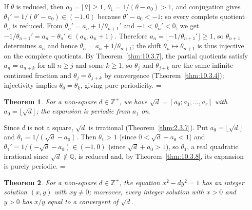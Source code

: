 \documentclass[11pt]{article}
\makeatletter
\theoremstyle{ntstyle}
\newtheorem{theorem}{Theorem}[subsection]
\let\nt@closedisplay\]
\def\nt@guardedclose{\@ifnextchar\par{\nt@closeafterpar}{\@ifnextchar\end{\postdisplaypenalty\@M\nt@closedisplay}{\nt@closedisplay}}}
\def\nt@closeafterpar\par{\@ifnextchar\par{\nt@closeafterpar}{\@ifnextchar\end{\postdisplaypenalty\@M\nt@closedisplay\par}{\nt@closedisplay\par}}}
\renewenvironment{proof}[1][\proofname]{\par
  \pushQED{\qed}\normalfont\topsep\medskipamount\edef\nt@afterproof{\@endparpenalty=\the\@endparpenalty\relax}\@beginparpenalty\@M\@endparpenalty\@M\let\]\nt@guardedclose\trivlist\item[]\textit{#1\@addpunct{.}} \ignorespaces}{\ifvmode\addpenalty\@M\fi\popQED\nt@afterproof\endtrivlist\@endpefalse}
\makeatother
\begin{document}
\begin{proof} If $\theta$ is reduced, then
	$a_0=\lfloor\theta\rfloor\ge1$, $\theta_1=1/(\theta-a_0)>1$, and
	conjugation gives $\theta_1'=1/(\theta'-a_0)\in(-1,0)$ because
	$\theta'-a_0<-1$; so every complete quotient $\theta_n$ is reduced.
	From $\theta_n'=a_n+1/\theta_{n+1}'$ and $-1<\theta_n'<0$,
	we get $-1/\theta_{n+1}'=a_n-\theta_n'\in(a_n,a_n+1)$.
	Therefore $a_n=\lfloor-1/\theta_{n+1}'\rfloor\ge1$, so
	$\theta_{n+1}$ determines $a_n$ and hence
	$\theta_n=a_n+1/\theta_{n+1}$; the shift
	$\theta_n\mapsto\theta_{n+1}$ is thus injective on the complete
	quotients. By Theorem~\ref{thm:10.3.7}, the partial quotients satisfy
	$a_n=a_{n+k}$ for all $n\ge j$ and some $k\ge1$, so $\theta_j$ and
	$\theta_{j+k}$ are the same infinite continued fraction and
	$\theta_j=\theta_{j+k}$ by convergence (Theorem~\ref{thm:10.3.4});
	injectivity implies $\theta_0=\theta_k$, giving pure
	periodicity.
\end{proof}
\begin{theorem}\label{thm:10.3.9} For a
	non-square $d\in\mathbb{Z}^+$, we have $\sqrt {d}=[a_0;\overline{a_1,\ldots,a_r}]$ with $a_0=\lfloor\sqrt{d}\rfloor$;
	the expansion is periodic from $a_1$ on.
\end{theorem}

\begin{proof} Since $d$ is not a square, $\sqrt{d}$ is irrational
	(Theorem~\ref{thm:2.3.7}). Put $a_0=\lfloor\sqrt{d}\rfloor$ and
	$\theta_1=1/(\sqrt{d}-a_0)$. Then $\theta_1>1$ (since $0<\sqrt {d}-a_0<1$) and
	$\theta_1'=1/(-\sqrt{d}-a_0)\in(-1,0)$ (since $\sqrt {d}+a_0>1$), so $\theta_1$, a real quadratic irrational
	since $\sqrt d\notin\mathbb{Q}$, is reduced and, by Theorem~\ref{thm:10.3.8}, its expansion is purely
	periodic.
\end{proof}

\begin{theorem}\label{thm:10.3.10}
	For a non-square $d\in\mathbb{Z}^+$, the equation $x^2-dy^2=1$ has an integer solution
	$(x,y)$ with $xy\neq0$; moreover, every integer solution with $x>0$ and $y>0$ has $x/y$ equal
	to a convergent of $\sqrt{d}$.
\end{theorem}
\end{document}
